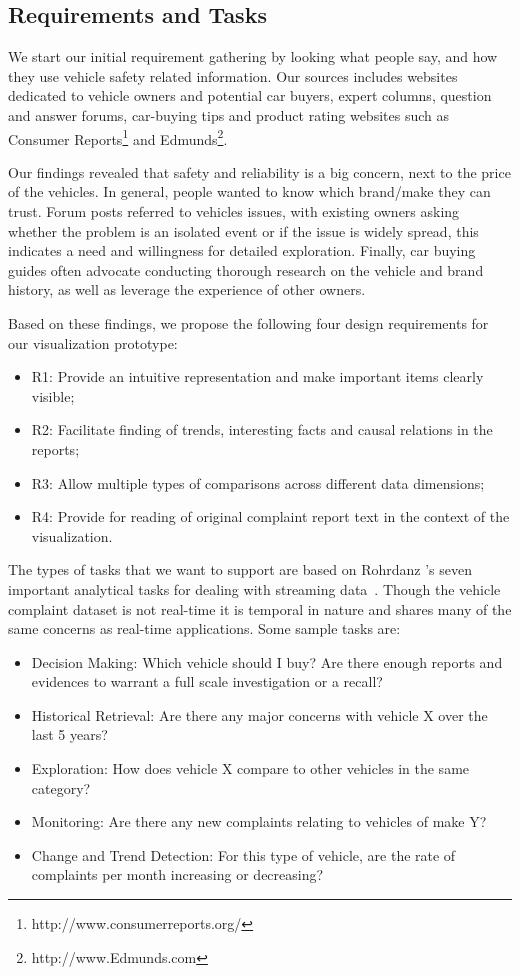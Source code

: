\subsection{Requirements and Tasks}
We start our initial requirement gathering by looking what people say, and
how they use vehicle safety related information. Our sources includes websites 
dedicated to vehicle owners and potential car buyers, expert columns, 
question and answer forums, car-buying tips and product rating websites such 
as Consumer Reports\footnote{http://www.consumerreports.org/} and
Edmunds\footnote{http://www.Edmunds.com}. 

Our findings revealed that safety and reliability is a big concern, next to the
price of the vehicles. In general, people wanted to know which brand/make 
they can trust. Forum posts referred to vehicles issues, with existing owners 
asking whether the problem is an isolated event or if the issue is widely spread, 
this indicates a need and willingness for detailed exploration. Finally, car buying 
guides often advocate conducting thorough research on the vehicle and brand history, 
as well as leverage the experience of other owners. 
 
Based on these findings, we propose the following four design requirements for
our visualization prototype:
\begin{itemize}[noitemsep]
  \item R1: Provide an intuitive representation and make important items clearly
  visible;
  \item R2: Facilitate finding of trends, interesting facts and causal relations
  in the reports;
  \item R3: Allow multiple types of comparisons across different data
  dimensions;
  \item R4: Provide for reading of original complaint report text in the context
  of the visualization.
\end{itemize}

The types of tasks that we want to support are based on Rohrdanz \etal's seven
important analytical tasks for dealing with streaming data~\cite{ROH2011a}. 
Though the vehicle complaint dataset is not real-time it is temporal in nature
and shares many of the same concerns as real-time applications. Some sample 
tasks are:

\begin{itemize}[noitemsep]
   \item Decision Making: Which vehicle should I buy? Are there enough
   reports and evidences to warrant a full scale investigation or a recall?
   \item Historical Retrieval: Are there any major concerns with vehicle X over the last 5 years?
   \item Exploration: How does vehicle X compare to other vehicles in the same category?
   \item Monitoring: Are there any new complaints relating to vehicles of make Y?
   \item Change and Trend Detection: For this type of vehicle, are the rate of complaints per month increasing or decreasing?
\end{itemize}


